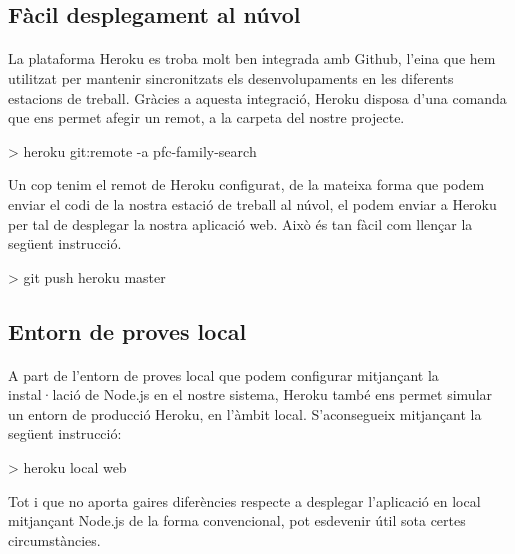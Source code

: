     \subsection{Fàcil desplegament al núvol}

    \paragraph{}
    La plataforma Heroku es troba molt ben integrada amb Github, l'eina que hem utilitzat per mantenir sincronitzats els desenvolupaments en les diferents estacions de treball. Gràcies a aquesta integració, Heroku disposa d'una comanda que ens permet afegir un remot, a la carpeta del nostre projecte.

    \begin{displayquote}
        > heroku git:remote -a pfc-family-search
    \end{displayquote}

    Un cop tenim el remot de Heroku configurat, de la mateixa forma que podem enviar el codi de la nostra estació de treball al núvol, el podem enviar a Heroku per tal de desplegar la nostra aplicació web. Això és tan fàcil com llençar la següent instrucció.

    \begin{displayquote}
        > git push heroku master
    \end{displayquote}


    \subsection{Entorn de proves local}

    \paragraph{}
    A part de l'entorn de proves local que podem configurar mitjançant la instal·lació de Node.js en el nostre sistema, Heroku també ens permet simular un entorn de producció Heroku, en l'àmbit local. S'aconsegueix mitjançant la següent instrucció:

    \begin{displayquote}
        > heroku local web
    \end{displayquote}

    Tot i que no aporta gaires diferències respecte a desplegar l'aplicació en local mitjançant Node.js de la forma convencional, pot esdevenir útil sota certes circumstàncies.


